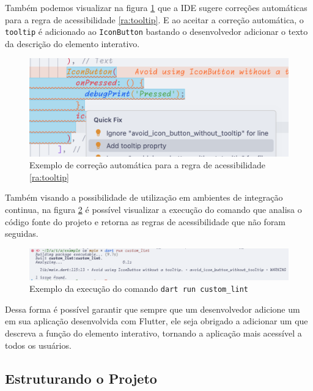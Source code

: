 Também podemos visualizar na figura \ref{fig:exemplo-correcao-automatica-tooltip} que a IDE sugere correções automáticas para a regra de acessibilidade \ref{ra:tooltip}. E ao aceitar a correção automática, o \texttt{tooltip} é adicionado ao \texttt{IconButton} bastando o desenvolvedor adicionar o texto da descrição do elemento interativo.

\begin{figure}[!ht]
	\centering
	\caption{Exemplo de correção automática para a regra de acessibilidade \ref{ra:tooltip}}\label{fig:exemplo-correcao-automatica-tooltip}
	\includegraphics[width=425pt]{Assets/PrintIDECorrecao.png}
\end{figure}

Também visando a possibilidade de utilização em ambientes de integração continua, na figura \ref{fig:exmplo-comando-erro} é possível visualizar a execução do comando  que analisa o código fonte do projeto e retorna as regras de acessibilidade que não foram seguidas.

\begin{figure}[!ht]
	\centering
	\caption{Exemplo da execução do comando \texttt{dart run custom\_lint}}\label{fig:exmplo-comando-erro}
	\includegraphics[width=425pt]{Assets/PrintComandoCustomLint.png}
\end{figure}

Dessa forma é possível garantir que sempre que um desenvolvedor adicione um  em sua aplicação desenvolvida com Flutter, ele seja obrigado a adicionar um  que descreva a função do elemento interativo, tornando a aplicação mais acessível a todos os usuários.

\subsection{Estruturando o Projeto}

